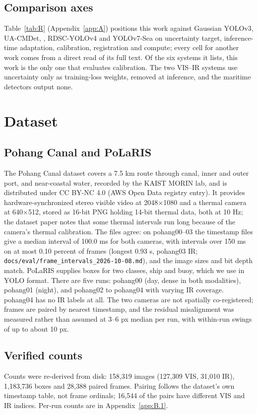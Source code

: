 \documentclass[10pt]{article}
\begin{document}
\subsection{Comparison axes}\label{sec:2.4}
Table~\ref{tab:R} (Appendix~\ref{app:A}) positions this work against Gaussian YOLOv3, UA-CMDet, \citet{zhao2024uncertaintyaware}, RDSC-YOLOv4 and YOLOv7-Sea on uncertainty target, inference-time adaptation, calibration, registration and compute; every cell for another work comes from a direct read of its full text. Of the six systems it lists, this work is the only one that evaluates calibration. The two VIS--IR systems use uncertainty only as training-loss weights, removed at inference, and the maritime detectors output none.

\section{Dataset}\label{sec:3}
\subsection{Pohang Canal and PoLaRIS}\label{sec:3.1}
The Pohang Canal dataset \citep{chung2023pohang} covers a 7.5 km route through canal, inner and outer port, and near-coastal water, recorded by the KAIST MORIN lab, and is distributed under CC BY-NC 4.0 (AWS Open Data registry entry). It provides hardware-synchronized stereo visible video at 2048$\times$1080 and a thermal camera at 640$\times$512, stored as 16-bit PNG holding 14-bit thermal data, both at 10 Hz; the dataset paper notes that some thermal intervals run long because of the camera's thermal calibration. The files agree: on pohang00--03 the timestamp files give a median interval of 100.0 ms for both cameras, with intervals over 150 ms on at most 0.10 percent of frames (longest 0.93 s, pohang03 IR; \texttt{docs/\allowbreak{}eval/\allowbreak{}frame\_\allowbreak{}intervals\_\allowbreak{}2026-10-08.md}), and the image sizes and bit depth match. PoLaRIS \citep{choi2025polaris} supplies boxes for two classes, ship and buoy, which we use in YOLO format. There are five runs: pohang00 (day, dense in both modalities), pohang01 (night), and pohang02 to pohang04 with varying IR coverage. pohang04 has no IR labels at all. The two cameras are not spatially co-registered; frames are paired by nearest timestamp, and the residual misalignment was measured rather than assumed at 3--6 px median per run, with within-run swings of up to about 10 px.

\subsection{Verified counts}\label{sec:3.2}
Counts were re-derived from disk: 158,319 images (127,309 VIS, 31,010 IR), 1,183,736 boxes and 28,388 paired frames. Pairing follows the dataset's own timestamp table, not frame ordinals; 16,544 of the pairs have different VIS and IR indices. Per-run counts are in Appendix~\ref{app:B.1}.
\end{document}
